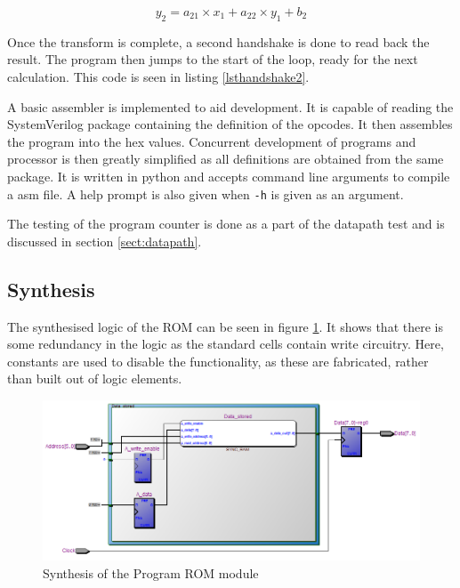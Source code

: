 \begin{equation}\label{eq:y2}
y_2 = a_{21} \times x_1 + a_{22} \times y_1 + b_2
\end{equation}





Once the transform is complete, a second handshake is done to read back the result. 
The program then jumps to the start of the loop, ready for the next calculation. 
This code is seen in listing \ref{lsthandshake2}.
\newpage



A basic assembler is implemented to aid development.
It is capable of reading the SystemVerilog package containing the definition of the opcodes.
It then assembles the program into the hex values. 
Concurrent development of programs and processor is then greatly simplified as all definitions are obtained from the same package.
It is written in python and accepts command line arguments to compile a asm file.
A help prompt is also given when \texttt{-h} is given as an argument.


The testing of the program counter is done as a part of the datapath test and is discussed in section \ref{sect:datapath}.
\subsection{Synthesis}

The synthesised logic of the ROM can be seen in figure \ref{fig:ramsynth}.
It shows that there is some redundancy in the logic as the standard cells contain write circuitry.
Here, constants are used to disable the functionality, as these are fabricated, rather than built out of logic elements.


\begin{figure}
\includegraphics[width=\textwidth]{Figures/ramsynth.png}
\caption{Synthesis of the Program ROM module}
\label{fig:ramsynth}
\end{figure}

